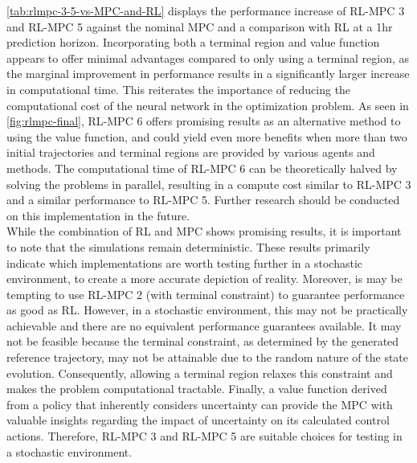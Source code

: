 \autoref{tab:rlmpc-3-5-vs-MPC-and-RL} displays the performance increase of RL-MPC 3 and RL-MPC 5 against the nominal MPC and a comparison with RL at a 1hr prediction horizon. Incorporating both a terminal region and value function  appears to offer minimal advantages compared to only using a terminal region, as the marginal improvement in performance results in a significantly larger increase in computational time. This reiterates the importance of reducing the computational cost of the neural network in the optimization problem. As seen in \autoref{fig:rlmpc-final}, RL-MPC 6 offers promising results as an alternative method to using the value function, and could yield even more benefits when more than two initial trajectories and terminal regions are provided by various agents and methods. The computational time of RL-MPC 6 can be theoretically halved by solving the problems in parallel, resulting in a compute cost similar to RL-MPC 3 and a similar performance to RL-MPC 5. Further research should be conducted on this implementation in the future.\\
While the combination of RL and MPC shows promising results, it is important to note that the simulations remain deterministic. These results primarily indicate which implementations are worth testing further in a stochastic environment, to create a more accurate depiction of reality. Moreover, is may be tempting to use RL-MPC 2 (with terminal constraint) to guarantee performance as good as RL. However, in a stochastic environment, this may not be practically achievable and there are no equivalent performance guarantees available. It may not be feasible because the terminal constraint, as determined by the generated reference trajectory, may not be attainable due to the random nature of the state evolution. Consequently, allowing a terminal region relaxes this constraint and makes the problem computational tractable. Finally, a value function derived from a policy that inherently considers uncertainty can provide the MPC with valuable insights regarding the impact of uncertainty on its calculated control actions. Therefore, RL-MPC 3 and RL-MPC 5 are suitable choices for testing in a stochastic environment.



